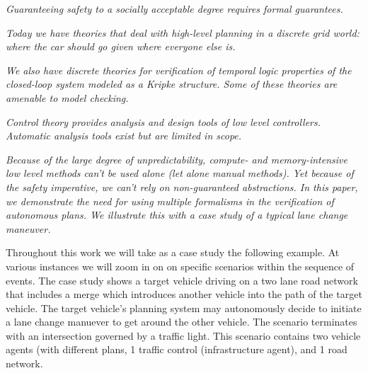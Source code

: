 

{\it Guaranteeing safety to a socially acceptable degree requires formal guarantees.}

{\it Today we have theories that deal with high-level planning in a discrete grid world: where the car should go given where everyone else is.}

{\it We also have discrete theories for verification of temporal logic properties of the closed-loop system modeled as a Kripke structure. Some of these theories are amenable to model checking.}

{\it Control theory provides analysis and design tools of low level controllers. Automatic analysis tools exist but are limited in scope.}

{\it Because of the large degree of unpredictability, compute- and memory-intensive low level methods can't be used alone (let alone manual methods). Yet because of the safety imperative, we can't rely on non-guaranteed abstractions.  In this paper, we demonstrate the need for using multiple formalisms in the verification of autonomous plans. We illustrate this with a case study of a typical lane change maneuver.}

\begin{exmp}
	
	Throughout this work we will take as a case study the following example. At various instances we will zoom in on on specific scenarios within the sequence of events. The case study shows a target vehicle driving on a two lane road network that includes a merge which introduces another vehicle into the path of the target vehicle. The target vehicle's planning system may autonomously decide to initiate a lane change manuever to get around the other vehicle. The scenario terminates with an intersection governed by a traffic light. This scenario contains two vehicle agents (with different plans, 1 traffic control (infrastructure agent), and 1 road network. 
	
\end{exmp}

